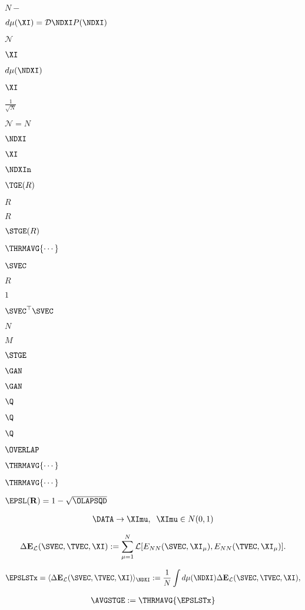 $N-$

$d\mu(\XI)=\mathcal{D}\NDXI P(\NDXI)$

$\mathcal{N}$

$\XI$

$d\mu(\NDXI)$

$\XI$

$\frac{1}{\sqrt{N}}$

$\mathcal{N}=N$

$\NDXI$

$\XI$

$\NDXIn$

$\TGE(R)$

$R$

$R$

$\STGE(R)$

$\THRMAVG{\cdots}$

$\SVEC$

$R$

$1$

$\SVEC^{\top}\SVEC$

$N$

$M$

$\STGE$

$\GAN$

$\GAN$

$\Q$

$\Q$

$\Q$

$\OVERLAP$

$\THRMAVG{\cdots}$

$\THRMAVG{\cdots}$

$\EPSL(\mathbf{R}) = 1 - \sqrt{\OLAPSQD}$

\begin{align}
\DATA\rightarrow\XImu,\;\;\XImu\in N(0,1)
\end{align}

\begin{align}
\label{eqn:DE_L}
\Delta\mathbf{E}_{\mathcal{L}}(\SVEC,\TVEC, \XI):=\sum_{\mu=1}^{N}\mathcal{L}[E_{NN}(\SVEC,\XI_{\mu}),E_{NN}(\TVEC,\XI_{\mu})]  .
\end{align}

\begin{align}
\label{eqn:STerror}
\EPSLSTx = \langle\Delta\mathbf{E}_{\mathcal{L}}(\SVEC,\TVEC,\XI)\rangle_{\NDXI}:=\frac{1}{N}\int d\mu(\NDXI)\Delta\mathbf{E}_{\mathcal{L}}(\SVEC,\TVEC,\XI)  ,
\end{align}

\begin{align}
\label{eqn:MGE}
\AVGSTGE:=\THRMAVG{\EPSLSTx}
\end{align}

